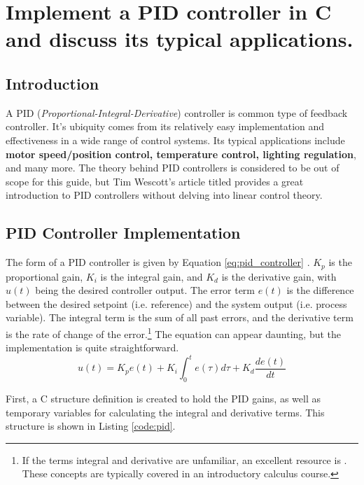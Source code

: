 \documentclass[main.tex]{subfiles}
\begin{document}
\section{Implement a PID controller in C and discuss its typical applications.} \label{section:pid} 

\spoilerline

\subsection{Introduction}
\noindent A PID (\textit{Proportional-Integral-Derivative}) controller is common type of feedback controller. It's ubiquity comes from its relatively easy implementation and effectiveness in a wide range of control systems. Its typical applications include \textbf{motor speed/position control, temperature control, lighting regulation}, and many more. The theory behind PID controllers is considered to be out of scope for this guide, but Tim Wescott's article titled  provides a great introduction to PID controllers without delving into linear control theory.

\subsection{PID Controller Implementation}
The form of a PID controller is given by Equation \eqref{eq:pid_controller} \cite{AbramovitchPID}. $K_p$ is the proportional gain, $K_i$ is the integral gain, and $K_d$ is the derivative gain, with $u(t)$ being the desired controller output. The error term $e(t)$ is the difference between the desired setpoint (i.e. reference) and the system output (i.e. process variable). The integral term is the sum of all past errors, and the derivative term is the rate of change of the error.\footnote{If the terms integral and derivative are unfamiliar, an excellent resource is . These concepts are typically covered in an introductory calculus course.} The equation can appear daunting, but the implementation is quite straightforward.
\begin{equation}
    u(t) = K_p e(t) + K_i \int_{0}^{t} e(\tau) d\tau + K_d \frac{de(t)}{dt}
    \label{eq:pid_controller}
\end{equation}

\noindent First, a C structure definition is created to hold the PID gains, as well as temporary variables for calculating the integral and derivative terms. This structure is shown in Listing \ref{code:pid}.

\end{document}
